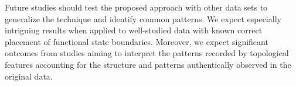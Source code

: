 \documentclass[shortAfour,times,sagev]{sagej}
\begin{document}
Future studies should test the proposed approach with other data sets to generalize
the technique and identify common patterns. We expect especially intriguing results
when applied to well-studied data with known correct placement of functional state
boundaries. Moreover, we expect significant outcomes from studies aiming to
interpret the patterns recorded by topological features accounting for the
structure and patterns authentically observed in the original data.



\end{document}
